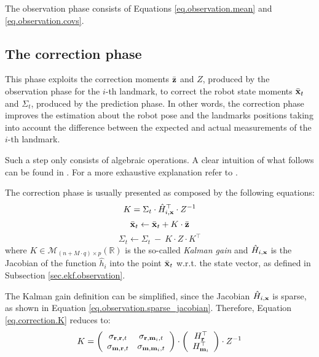	\vspace{1cm}
	\begin{recap}
		The observation phase consists of Equations \ref{eq.observation.mean} and \ref{eq.observation.covs}.
	\end{recap}
	
\subsection{The correction phase}
	This phase exploits the correction moments $\bar{\boldsymbol{\mathrm{{z}}}}$ and $Z$, produced by the observation phase for the $i$-th landmark, to correct the robot state moments $\bar{\boldsymbol{\mathrm{{x}}}}_t$ and $\Sigma_t$, produced by the prediction phase. 
	In other words, the correction phase improves the estimation about the robot pose and the landmarks positions taking into account the difference between the expected and actual measurements of the $i$-th landmark.
	
	Such a step only consists of algebraic operations. 
	A clear intuition of what follows can be found in \cite[Unit C]{brenner204}.
	For a more exhaustive explanation refer to \cite[Ch. 3]{thrun2005}.
	
	The correction phase is usually presented as composed by the following equations:
	\begin{equation}
		\label{eq.correction.K}
		K = \Sigma_t \cdot \hat{H}^\top_{i,\boldsymbol{\mathrm{{x}}}} \cdot Z^{-1}
	\end{equation}
	\begin{equation}
		\label{eq.correction.x}
		\bar{\boldsymbol{\mathrm{{x}}}}_t \leftarrow \bar{\boldsymbol{\mathrm{{x}}}}_t + K \cdot \bar{\boldsymbol{\mathrm{{z}}}}
	\end{equation}
	\begin{equation}
		\label{eq.correction.Sigma}
		\Sigma_t \leftarrow \Sigma_t \ - \ K \cdot Z \cdot K^\top
	\end{equation}
	where $K \in \mathcal{M}_{(n + M \cdot q) \times p}(\mathbb{R})$ is the so-called \emph{Kalman gain} and $\hat{H}_{i,\boldsymbol{\mathrm{{x}}}}$ is the Jacobian of the function $\hat{h}_i$ into the point $\bar{\boldsymbol{\mathrm{{x}}}}_t$ w.r.t. the state vector, as defined in Subsection \ref{sec.ekf.observation}.
	
	The Kalman gain definition can be simplified, since the Jacobian $\hat{H}_{i,\boldsymbol{\mathrm{{x}}}}$ is sparse, as shown in Equation \ref{eq.observation.sparse_jacobian}.
	Therefore, Equation \ref{eq.correction.K} reduces to:
	\begin{equation}
		\label{eq.correction.kalman_gain}
		K = 
		\left(\begin{array}{cc}
			\sigma_{\boldsymbol{\mathrm{{r}}}, \boldsymbol{\mathrm{{r}}}, t} & \sigma_{\boldsymbol{\mathrm{{r}}}, \boldsymbol{\mathrm{{m}}}_i, t} \\
			\sigma_{\boldsymbol{\mathrm{{m}}}, \boldsymbol{\mathrm{{r}}}, t} & \sigma_{\boldsymbol{\mathrm{{m}}}, \boldsymbol{\mathrm{{m}}}_i, t}
		\end{array}\right)
		\cdot
		\left(\begin{array}{c}
			H^\top_{\boldsymbol{\mathrm{{r}}}} \\ H^\top_{\boldsymbol{\mathrm{{m}}}_i}
		\end{array}\right)
		\cdot
		Z^{-1}
	\end{equation}
	
